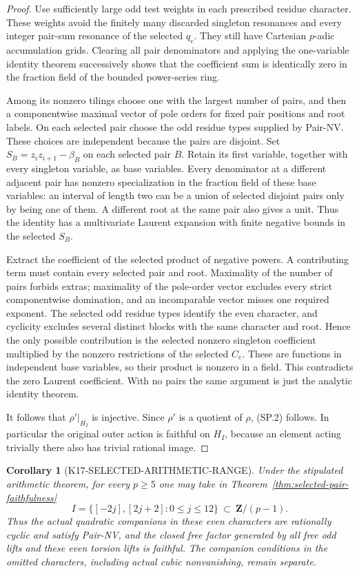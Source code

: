 \documentclass[11pt,a4paper]{article}
\newtheorem{corollary}[theorem]{Corollary}
\theoremstyle{definition}
\begin{document}
\begin{proof}
Use sufficiently large odd test weights in each prescribed
residue character. These weights avoid the finitely many
discarded singleton resonances and every integer pair-sum
resonance of the selected $q_e$. They still have Cartesian
$p$-adic accumulation grids. Clearing all pair denominators
and applying the one-variable identity theorem successively
shows that the coefficient sum is identically zero in the
fraction field of the bounded power-series ring.

Among its nonzero tilings choose one with the largest number
of pairs, and then a componentwise maximal vector of pole
orders for fixed pair positions and root labels. On each
selected pair choose the odd residue types supplied by
Pair-NV. These choices are independent because the pairs
are disjoint. Set $S_B=z_i z_{i+1}-\beta_B$ on each selected
pair $B$. Retain its first variable, together with every
singleton variable, as base variables. Every denominator at
a different adjacent pair has nonzero specialization in the
fraction field of these base variables: an interval of length
two can be a union of selected disjoint pairs only by being
one of them. A different root at the same pair also gives a
unit. Thus the identity has a multivariate Laurent expansion
with finite negative bounds in the selected $S_B$.

Extract the coefficient of the selected product of negative
powers. A contributing term must contain every selected pair
and root. Maximality of the number of pairs forbids extras;
maximality of the pole-order vector excludes every strict
componentwise domination, and an incomparable vector misses
one required exponent. The selected odd residue types identify
the even character, and cyclicity excludes several distinct
blocks with the same character and root. Hence the only
possible contribution is the selected nonzero singleton
coefficient multiplied by the nonzero restrictions of the
selected $C_e$. These are functions in independent base
variables, so their product is nonzero in a field. This
contradicts the zero Laurent coefficient. With no pairs the
same argument is just the analytic identity theorem.

It follows that $\rho'|_{H_I}$ is injective. Since $\rho'$
is a quotient of $\rho$, (SP.2) follows. In particular the
original outer action is faithful on $H_I$, because an
element acting trivially there also has trivial rational image.
\end{proof}

\begin{corollary}[K17-SELECTED-ARITHMETIC-RANGE]
\label{cor:selected-arithmetic-range}
Under the stipulated arithmetic theorem, for every $p\geq5$
one may take in Theorem~\ref{thm:selected-pair-faithfulness}
\[
 I=\{[-2j],[2j+2]:0\leq j\leq12\}
        \ \subset\ \mathbf Z/(p-1).
 \tag{SP.5}
\]
Thus the actual quadratic companions in these even characters
are rationally cyclic and satisfy Pair-NV, and the closed free
factor generated by all free odd lifts and these even torsion
lifts is faithful. The companion conditions in the omitted
characters, including actual cubic nonvanishing, remain separate.
\end{corollary}
\end{document}

